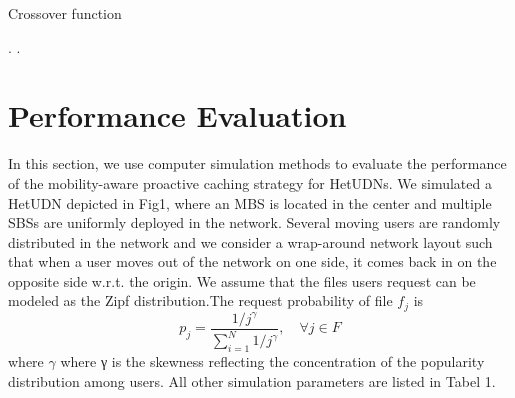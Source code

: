 \documentclass[conference]{IEEEtran}
\begin{document}
\begin{algorithm}[htb]
 \caption{Crossover function}
 \label{alg:admission}
 \begin{algorithmic}[1] %
  \ELSE
  \ENDIF
{}
.
\ENDWHILE
{}
.
\ENDWHILE
  \ENDFOR
 \end{algorithmic}
\end{algorithm}

\section{Performance Evaluation}
In this section, we use computer simulation methods to evaluate the performance of the mobility-aware proactive caching strategy for HetUDNs. We simulated a HetUDN depicted in Fig1, where an MBS is located in the center and multiple SBSs are uniformly deployed in the network. Several moving users are randomly distributed in the network and we consider a wrap-around network layout such that when a user moves out of the network on one side, it comes back in on the opposite side w.r.t. the origin. We assume that the files users request can be modeled as the Zipf distribution.The request probability of file $f_j$ is
$$p_j=\frac{1/j^\gamma}{\sum_{i=1}^N 1/j^\gamma}, \quad \forall j\in F$$
where $\gamma$ where γ is the skewness reflecting the concentration of the popularity distribution among users. All other simulation parameters are listed in Tabel 1.
\end{document}
